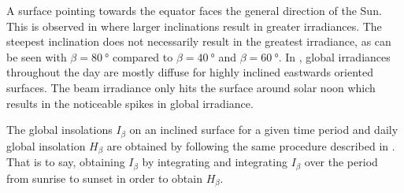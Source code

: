 A surface pointing towards the equator faces the general direction of the Sun. This is observed in  where larger inclinations result in greater irradiances. The steepest inclination does not necessarily result in the greatest irradiance, as can be seen with $\beta = \SI{80}{\degree}$ compared to $\beta = \SI{40}{\degree}$ and $\beta = \SI{60}{\degree}$. In , global irradiances throughout the day are mostly diffuse for highly inclined eastwards oriented surfaces. The beam irradiance only hits the surface around solar noon which results in the noticeable spikes in global irradiance.

The global insolations $I_{\beta}$ on an inclined surface for a given time period and daily global insolation $H_{\beta}$ are obtained by following the same procedure described in . That is to say, obtaining $I_{\beta}$ by integrating  and integrating $I_{\beta}$ over the period from sunrise to sunset in order to obtain $H_{\beta}$.



